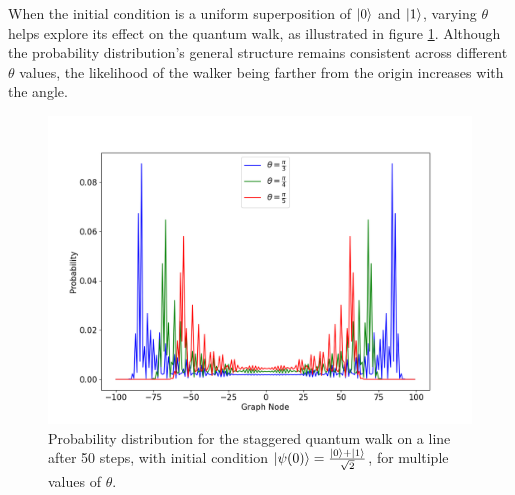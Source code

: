 \documentclass[../../main.tex]{subfiles}
\begin{document}
%

When the initial condition is a uniform superposition of $\ket{0}$ and
$\ket{1}$, varying $\theta$ helps explore its effect on the quantum walk, as
illustrated in figure \ref{fig:stagQWSimulMultTheta}. Although the probability
distribution's general structure remains consistent across different $\theta$
values, the likelihood of the walker being farther from the origin increases
with the angle.


\begin{figure}[!h]
	\centering
	\includegraphics[scale=0.40]{img/Sec2/stagqwMultiple.png}
    \caption{Probability distribution for the staggered quantum walk on a line
    after 50 steps, with initial condition
    $\ket{\psi(0)}=\frac{\ket{0}+\ket{1}}{\sqrt{2}}$, for multiple values of
    $\theta$.} \label{fig:stagQWSimulMultTheta}
\end{figure}\par
\end{document}
